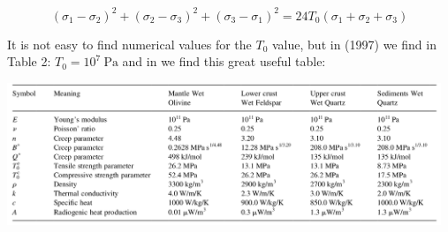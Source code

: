 \[
(\sigma_1-\sigma_2)^2 + (\sigma_2-\sigma_3)^2 + (\sigma_3-\sigma_1)^2
=
24T_0 (\sigma_1+\sigma_2+\sigma_3)
\]

It is not easy to find numerical values for the $T_0$ value, but in \textcite{babr97} (1997) we find  
in Table 2: $T_0=10^7~\si{\pascal}$ and in \textcite{hanl00} we find this great useful table:
\begin{center}
\includegraphics[width=13cm]{images/griffith_murrell/hanl00}
\end{center}




